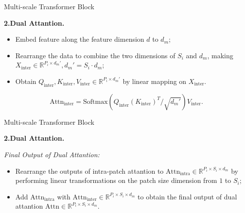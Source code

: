 \documentclass[12pt,aspectratio=169]{beamer}
\begin{document}
\begin{frame}{Multi-scale Transformer Block}

  \textbf{2.Dual Attantion.}

  \textit{\color{ECNURed}{Inter-patch Attantion:}}

  \begin{itemize}

    \item Embed feature along the feature dimension $d$ to $d_m$;

    \item Rearrange the data to combine the two dimensions of $S_i$ and $d_m$,
    making $X_\mathrm{inter}\in\mathbb{R}^{P_i\times d_m'}, d_m'=S_i\cdot d_m$;

    \item Obtain $Q_\mathrm{inter},K_\mathrm{inter},V_\mathrm{inter}\in
    \mathbb{R}^{P_i\times d_m'}$ by linear mapping on $X_\mathrm{inter}$.

  \end{itemize}

  \vspace{-0.5cm}

  {\color{ECNURed}

    $$\mathrm{Attn}_\mathrm{inter}=\mathrm{Softmax}\left(Q_\mathrm{inter}(K_\mathrm{inter})^T/\sqrt{d_m'}\right)V_\mathrm{inter}.$$
    
  }

\end{frame}

\begin{frame}{Multi-scale Transformer Block}

  \textbf{2.Dual Attantion.}

  \textit{Final Output of Dual Attantion:}

  \begin{itemize}

    \item Rearrange the outputs of intra-patch attantion to 
    $\mathrm{Attn}_\mathrm{intra}\in\mathbb{R}^{P_i\times S_i\times d_m}$ by 
    performing linear transformations on the patch size dimension from $1$ to $S_i$;

    \item Add $\mathrm{Attn}_\mathrm{intra}$ with $\mathrm{Attn}_\mathrm{inter}
    \in\mathbb{R}^{P_i\times S_i\times d_m}$ to obtain the final output of 
    dual attantion {\color{ECNURed}$\mathrm{Attn}\in\mathbb{R}^{P_i\times S_i\times d_m}$}.

  \end{itemize}

\end{frame}
\end{document}
